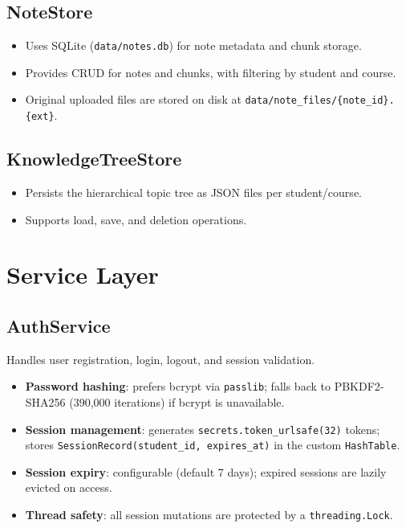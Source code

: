 \documentclass[12pt,a4paper]{article}
\begin{document}
\subsection{NoteStore}

\begin{itemize}[nosep]
    \item Uses SQLite (\texttt{data/notes.db}) for note metadata and chunk storage.
    \item Provides CRUD for notes and chunks, with filtering by student and course.
    \item Original uploaded files are stored on disk at \texttt{data/note\_files/\{note\_id\}.\{ext\}}.
\end{itemize}

\subsection{KnowledgeTreeStore}

\begin{itemize}[nosep]
    \item Persists the hierarchical topic tree as JSON files per student/course.
    \item Supports load, save, and deletion operations.
\end{itemize}

\section{Service Layer}
\label{sec:services}

\subsection{AuthService}

Handles user registration, login, logout, and session validation.

\begin{itemize}[nosep]
    \item \textbf{Password hashing}: prefers bcrypt via \texttt{passlib}; falls back to PBKDF2-SHA256 (390,000 iterations) if bcrypt is unavailable.
    \item \textbf{Session management}: generates \texttt{secrets.token\_urlsafe(32)} tokens; stores \texttt{SessionRecord(student\_id, expires\_at)} in the custom \texttt{HashTable}.
    \item \textbf{Session expiry}: configurable (default 7 days); expired sessions are lazily evicted on access.
    \item \textbf{Thread safety}: all session mutations are protected by a \texttt{threading.Lock}.
\end{itemize}
\end{document}
